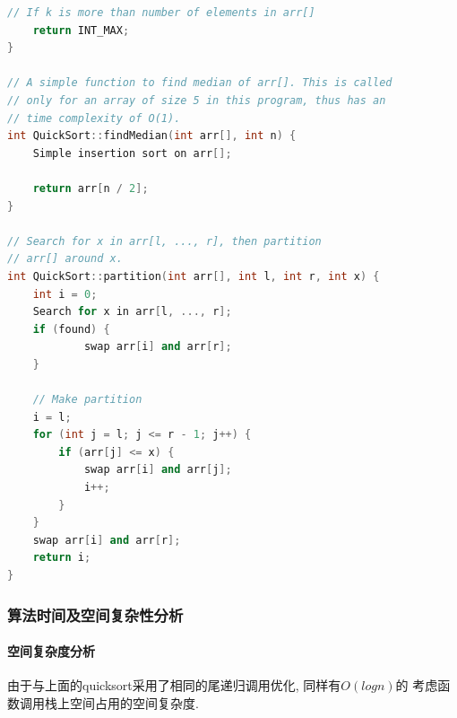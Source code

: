 \begin{lstlisting}[language=c++]
    // If k is more than number of elements in arr[]
    return INT_MAX;
}

// A simple function to find median of arr[]. This is called
// only for an array of size 5 in this program, thus has an
// time complexity of O(1).
int QuickSort::findMedian(int arr[], int n) {
  	Simple insertion sort on arr[];

    return arr[n / 2];
}

// Search for x in arr[l, ..., r], then partition
// arr[] around x.
int QuickSort::partition(int arr[], int l, int r, int x) {
    int i = 0;
    Search for x in arr[l, ..., r];
    if (found) {
			swap arr[i] and arr[r];
    }

    // Make partition
    i = l;
    for (int j = l; j <= r - 1; j++) {
        if (arr[j] <= x) {
            swap arr[i] and arr[j];
            i++;
        }
    }
  	swap arr[i] and arr[r];
    return i;
}
\end{lstlisting}

\subsubsection{算法时间及空间复杂性分析}
\paragraph{空间复杂度分析}
由于与上面的quicksort采用了相同的尾递归调用优化, 同样有$O(log{n})$的
考虑函数调用栈上空间占用的空间复杂度.

